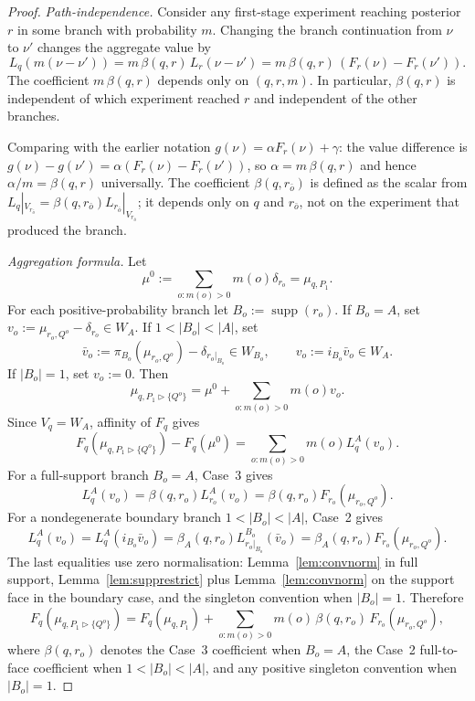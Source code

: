 \documentclass[11pt,a4paper]{article}
\theoremstyle{definition}
\newcommand{\1}{\mathbf 1}
\begin{document}
\begin{proof}
\emph{Path-independence.}  Consider any first-stage experiment reaching posterior $r$ in some branch with probability
$m$.  Changing the branch continuation from $\nu$ to $\nu'$ changes the aggregate value by
\[
L_q(m(\nu-\nu'))=m\,\beta(q,r)\,L_r(\nu-\nu')=m\,\beta(q,r)\,(F_r(\nu)-F_r(\nu')).
\]
The coefficient $m\,\beta(q,r)$ depends only on $(q,r,m)$.  In particular, $\beta(q,r)$ is independent of which
experiment reached $r$ and independent of the other branches.

Comparing with the earlier notation $g(\nu)=\alpha F_r(\nu)+\gamma$: the value difference is
$g(\nu)-g(\nu')=\alpha(F_r(\nu)-F_r(\nu'))$, so $\alpha=m\,\beta(q,r)$ and hence $\alpha/m=\beta(q,r)$ universally.
The coefficient $\beta(q,r_{\bar o})$ is defined as the scalar from $L_q|_{V_{r_{\bar o}}}=\beta(q,r_{\bar o})L_{r_{\bar o}}|_{V_{r_{\bar o}}}$;
it depends only on $q$ and $r_{\bar o}$, not on the experiment that produced the branch.

\emph{Aggregation formula.}  Let
\[
\mu^0:=\sum_{o:m(o)>0}m(o)\delta_{r_o}=\mu_{q,P_1}.
\]
For each positive-probability branch let $B_o:=\operatorname{supp}(r_o)$.  If $B_o=A$, set
$v_o:=\mu_{r_o,Q^o}-\delta_{r_o}\in W_A$.  If $1<|B_o|<|A|$, set
\[
\bar v_o:=\pi_{B_o}(\mu_{r_o,Q^o})-\delta_{r_o|_{B_o}}\in W_{B_o},
\qquad
v_o:=i_{B_o}\bar v_o\in W_A.
\]
If $|B_o|=1$, set $v_o:=0$.  Then
\[
\mu_{q,P_1\triangleright\{Q^o\}}=\mu^0+\sum_{o:m(o)>0}m(o)v_o .
\]
Since $V_q=W_A$, affinity of $F_q$ gives
\[
F_q(\mu_{q,P_1\triangleright\{Q^o\}})-F_q(\mu^0)
=\sum_{o:m(o)>0}m(o)L_q^A(v_o).
\]
For a full-support branch $B_o=A$, Case~3 gives
\[
L_q^A(v_o)=\beta(q,r_o)L_{r_o}^A(v_o)
=\beta(q,r_o)F_{r_o}(\mu_{r_o,Q^o}).
\]
For a nondegenerate boundary branch $1<|B_o|<|A|$, Case~2 gives
\[
L_q^A(v_o)=L_q^A(i_{B_o}\bar v_o)
=\beta_A(q,r_o)L_{r_o|_{B_o}}^{B_o}(\bar v_o)
=\beta_A(q,r_o)F_{r_o}(\mu_{r_o,Q^o}).
\]
The last equalities use zero normalisation: Lemma~\ref{lem:convnorm} in full support, Lemma~\ref{lem:supprestrict} plus
Lemma~\ref{lem:convnorm} on the support face in the boundary case, and the singleton convention when $|B_o|=1$.  Therefore
\[
F_q(\mu_{q,P_1\triangleright\{Q^o\}})
=
F_q(\mu_{q,P_1})+\sum_{o:m(o)>0}m(o)\,\beta(q,r_o)\,F_{r_o}(\mu_{r_o,Q^o}),
\]
where $\beta(q,r_o)$ denotes the Case~3 coefficient when $B_o=A$, the Case~2 full-to-face coefficient when
$1<|B_o|<|A|$, and any positive singleton convention when $|B_o|=1$.
\end{proof}
\end{document}
